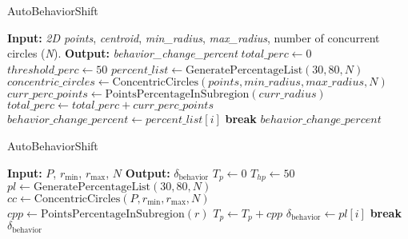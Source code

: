 \begin{algorithm}[H]
    \caption{AutoBehaviorShift}
    \begin{algorithmic}[1]
    \Statex \textbf{Input: } \textit{2D points}, \textit{centroid}, \textit{min\_radius}, \textit{max\_radius}, number of concurrent circles (\textit{N}).
    \Statex \textbf{Output: }\textit{behavior\_change\_percent}
    \newline
    \State $total\_perc \gets 0$
    \State $threshold\_perc \gets 50$
    \State $percent\_list \gets \text{GeneratePercentageList}(30, 80, N)$ 
    \State $concentric\_circles \gets \text{ConcentricCircles}(points, min\_radius, max\_radius, N)$
        \State $curr\_perc\_points \gets \text{PointsPercentageInSubregion}(curr\_radius)$
        \State $total\_perc \gets total\_perc + curr\_perc\_points$
            \State $behavior\_change\_percent \gets percent\_list[i]$
            \State \textbf{break}
        \EndIf
    \EndFor
    \State \Return $behavior\_change\_percent$
    \end{algorithmic}
\end{algorithm}



\begin{algorithm}[H]
    \caption{AutoBehaviorShift}
    \label{alg:autobehaviorshift}
    \begin{algorithmic}[1]
    \Statex \textbf{Input: }  $P$, $r_{\text{min}}$, $r_{\text{max}}$, $N$ 
    \Statex \textbf{Output: } $\delta_{\text{behavior}}$ 
    \newline
    \State $T_p \leftarrow 0$ 
    \State $T_{hp} \leftarrow 50$ 
    \State $pl \leftarrow \text{GeneratePercentageList}(30, 80, N)$
    \State $cc \leftarrow \text{ConcentricCircles}(P, r_{\text{min}}, r_{\text{max}}, N)$
        \State $cpp \leftarrow \text{PointsPercentageInSubregion}(r)$
        \State $T_p \leftarrow T_p + cpp$
            \State $\delta_{\text{behavior}} \leftarrow pl[i]$
            \State \textbf{break}
        \EndIf
    \EndFor
    \State \Return $\delta_{\text{behavior}}$
    \end{algorithmic}
    \end{algorithm}
    
